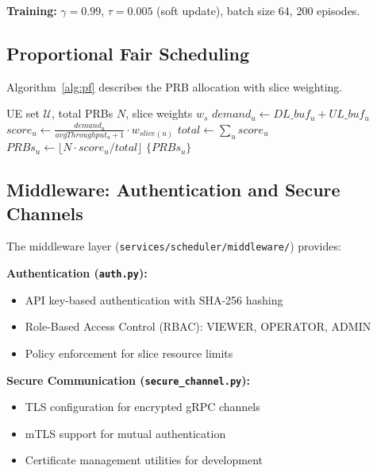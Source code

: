 \documentclass[journal]{IEEEtran}
\begin{document}
\textbf{Training:} $\gamma=0.99$, $\tau=0.005$ (soft update), batch size 64, 200 episodes.

\subsection{Proportional Fair Scheduling}

Algorithm~\ref{alg:pf} describes the PRB allocation with slice weighting.

\begin{algorithm}[t]
\caption{Proportional Fair Allocation with Slice Weights}
\label{alg:pf}
\begin{algorithmic}[1]
\REQUIRE UE set $\mathcal{U}$, total PRBs $N$, slice weights $w_s$
    \STATE $demand_u \gets DL\_buf_u + UL\_buf_u$
    \STATE $score_u \gets \frac{demand_u}{avgThroughput_u + 1} \cdot w_{slice(u)}$
\ENDFOR
\STATE $total \gets \sum_{u} score_u$
    \STATE $PRBs_u \gets \lfloor N \cdot score_u / total \rfloor$
\ENDFOR
\RETURN $\{PRBs_u\}$
\end{algorithmic}
\end{algorithm}

\subsection{Middleware: Authentication and Secure Channels}

The middleware layer (\texttt{services/scheduler/middleware/}) provides:

\textbf{Authentication (\texttt{auth.py}):}
\begin{itemize}
    \item API key-based authentication with SHA-256 hashing
    \item Role-Based Access Control (RBAC): VIEWER, OPERATOR, ADMIN
    \item Policy enforcement for slice resource limits
\end{itemize}

\textbf{Secure Communication (\texttt{secure\_channel.py}):}
\begin{itemize}
    \item TLS configuration for encrypted gRPC channels
    \item mTLS support for mutual authentication
    \item Certificate management utilities for development
\end{itemize}
\end{document}
